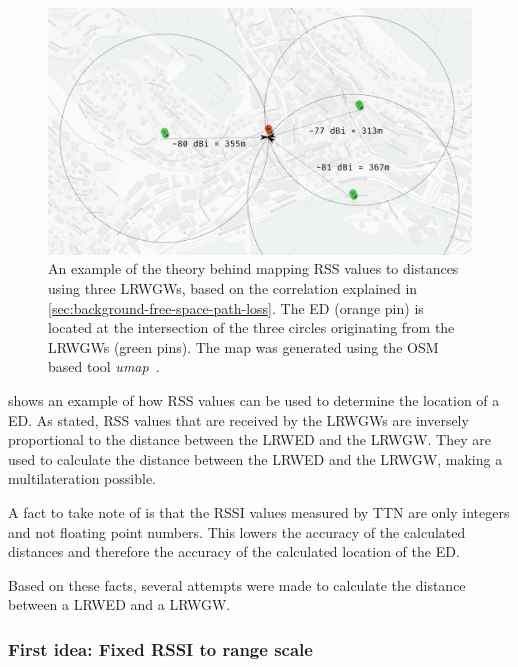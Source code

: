 \begin{figure}[htbp]
    \centering
    \includegraphics[width=1\textwidth]{pictures/multilateration/rssi-multilateration-example.png}
    \caption{
        An example of the theory behind mapping \ac{RSS} values to distances using three \aclp{LRWGW}, based on the correlation explained in \cref{sec:background-free-space-path-loss}.
        The \acl{ED} (orange pin) is located at the intersection of the three circles originating from the \aclp{LRWGW} (green pins).
        The map was generated using the \ac{OSM} based tool \emph{umap}~\cite{noauthor_umap_nodate}.
    }\label{fig:rssi-multilateration-theoretical-example}
\end{figure}

 shows an example of how \ac{RSS} values can be used to determine the location of a \acl{ED}.
As stated, \ac{RSS} values that are received by the \aclp{LRWGW} are inversely proportional to the distance between the \acl{LRWED} and the \acl{LRWGW}.
They are used to calculate the distance between the \acl{LRWED} and the \acl{LRWGW}, making a multilateration possible.

A fact to take note of is that the \ac{RSSI} values measured by \ac{TTN} are only integers and not floating point numbers.
This lowers the accuracy of the calculated distances and therefore the accuracy of the calculated location of the \acl{ED}.

Based on these facts, several attempts were made to calculate the distance between a \acl{LRWED} and a \acl{LRWGW}.

\subsubsection{First idea: Fixed \acs{RSSI} to range scale}\label{sec:fixed-rssi-to-range-scale}\label{sec:fixed-rssi-to-range-scale-impl}

